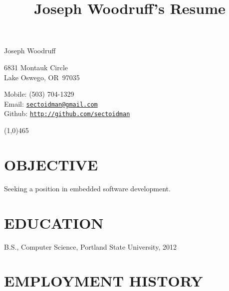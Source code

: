 \documentclass{article}
\title{Joseph Woodruff's Resume}
\makeatletter
\newcommand{\name}{Joseph Woodruff}
\newcommand{\address}{6831 Montauk Circle}
\newcommand{\city}{Lake Oswego}
\newcommand{\state}{OR}
\newcommand{\zip}{97035}
\newcommand{\phone}{(503) 704-1329}
\newcommand{\email}{\href{mailto:sectoidman@gmail.com}{sectoidman@gmail.com}}
\newcommand{\webpage}{http://github.com/sectoidman}
\makeatother
\begin{document}
{\huge \name}

\vspace{0.125in}

\begin{minipage}[t]{0.5\textwidth}
	\address\\
	\city, \state\ \zip
\end{minipage}
\begin{minipage}[t]{0.5\textwidth}
	Mobile: \phone \\
	Email: \texttt{\email} \\Github: \texttt{\url{\webpage}} \\
\end{minipage}

\begin{center}
\line(1,0){465}
\end{center}

\section*{OBJECTIVE}
	Seeking a position in embedded software development.

\section*{EDUCATION}
	B.S., Computer Science, Portland State University, 2012


\renewenvironment{itemize}{
	\begin{list}{$\bullet$}{
	\setlength{\leftmargin}{1.5em}
	\setlength{\itemsep}{0.25em}
	\setlength{\parskip}{0pt}
	\setlength{\parsep}{0.25em}
}
}{
	\end{list}
}

\section*{EMPLOYMENT HISTORY}
\end{document}
